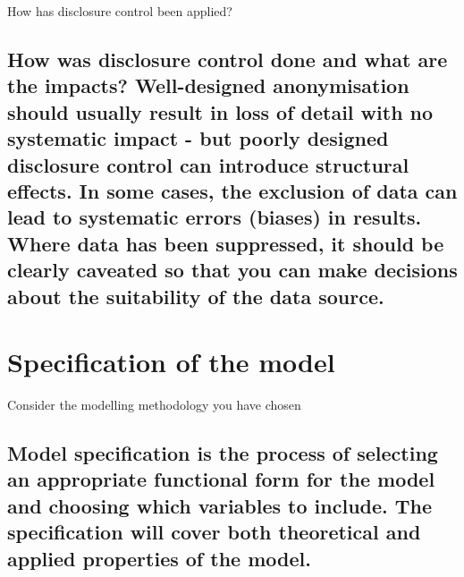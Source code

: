 \documentclass[]{book}
\begin{document}
 How has disclosure control been applied?

\subsection{How was disclosure control done and what are the impacts?
Well-designed anonymisation should usually result in loss of detail with
no systematic impact - but poorly designed disclosure control can
introduce structural effects. In some cases, the exclusion of data can
lead to systematic errors (biases) in results. Where data has been
suppressed, it should be clearly caveated so that you can make decisions
about the suitability of the data
source.}\label{how-was-disclosure-control-done-and-what-are-the-impacts-well-designed-anonymisation-should-usually-result-in-loss-of-detail-with-no-systematic-impact---but-poorly-designed-disclosure-control-can-introduce-structural-effects.-in-some-cases-the-exclusion-of-data-can-lead-to-systematic-errors-biases-in-results.-where-data-has-been-suppressed-it-should-be-clearly-caveated-so-that-you-can-make-decisions-about-the-suitability-of-the-data-source.}

\section{Specification of the model}\label{specification-of-the-model}

 Consider the modelling methodology you have chosen

\subsection{Model specification is the process of selecting an
appropriate functional form for the model and choosing which variables
to include. The specification will cover both theoretical and applied
properties of the
model.}\label{model-specification-is-the-process-of-selecting-an-appropriate-functional-form-for-the-model-and-choosing-which-variables-to-include.-the-specification-will-cover-both-theoretical-and-applied-properties-of-the-model.}
\end{document}
